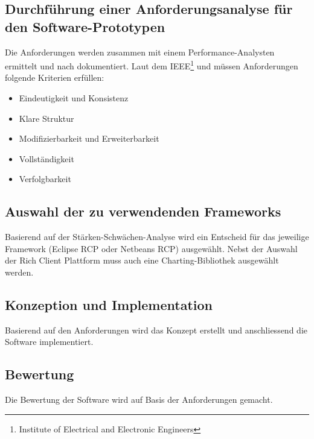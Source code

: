 \subsection{Durchführung einer Anforderungsanalyse für den Software-Prototypen}
Die Anforderungen werden zusammen mit einem Performance-Analysten ermittelt und nach \cite[4.3.2 Angepasste Standardinhalte]{pohl2010basiswissen} dokumentiert. Laut dem IEEE\footnote{Institute of Electrical and Electronic Engineers} und \cite[4.5 Qualitätskriterien für das Anforderungsdokument]{pohl2010basiswissen} müssen Anforderungen folgende Kriterien erfüllen:
\begin{itemize}
	\item Eindeutigkeit und Konsistenz
	\item Klare Struktur
	\item Modifizierbarkeit und Erweiterbarkeit
	\item Vollständigkeit
	\item Verfolgbarkeit
\end{itemize}
\subsection{Auswahl der zu verwendenden Frameworks}
Basierend auf der Stärken-Schwächen-Analyse wird ein Entscheid für das jeweilige Framework (Eclipse RCP oder Netbeans RCP)  ausgewählt. Nebst der Auswahl der Rich Client Plattform muss auch eine Charting-Bibliothek ausgewählt werden.

\subsection{Konzeption und Implementation}
Basierend auf den Anforderungen wird das Konzept erstellt und anschliessend die Software implementiert. 

\subsection{Bewertung}
Die Bewertung der Software wird auf Basis der Anforderungen gemacht.



